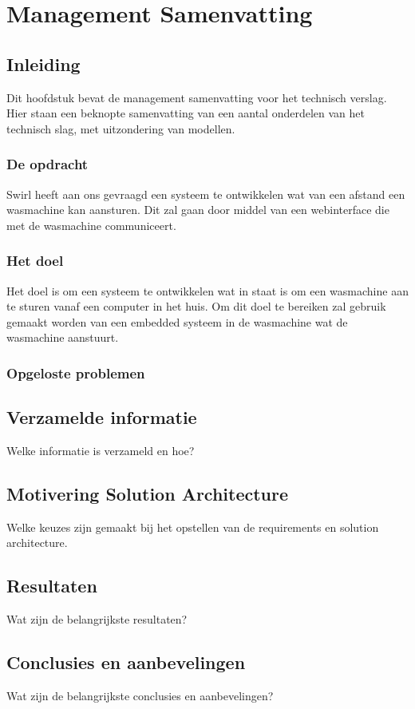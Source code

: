 \chapter{Management Samenvatting}
\section{Inleiding}
Dit hoofdstuk bevat de management samenvatting voor het technisch verslag.
Hier staan een beknopte samenvatting van een aantal onderdelen van het technisch slag, met uitzondering van modellen.

\subsection{De opdracht}
Swirl \textregistered heeft aan ons gevraagd een systeem te ontwikkelen wat van een afstand een wasmachine kan aansturen.
Dit zal gaan door middel van een webinterface die met de wasmachine communiceert.

\subsection{Het doel}
Het doel is om een systeem te ontwikkelen wat in staat is om een wasmachine aan te sturen vanaf een computer in het huis.
Om dit doel te bereiken zal gebruik gemaakt worden van een embedded systeem in de wasmachine wat de wasmachine aanstuurt.

\subsection{Opgeloste problemen}

\section{Verzamelde informatie}
Welke informatie is verzameld en hoe?

\section{Motivering Solution Architecture}
Welke keuzes zijn gemaakt bij het opstellen van de requirements en solution architecture.

\section{Resultaten}
Wat zijn de belangrijkste resultaten?

\section{Conclusies en aanbevelingen}
Wat zijn de belangrijkste conclusies en aanbevelingen?